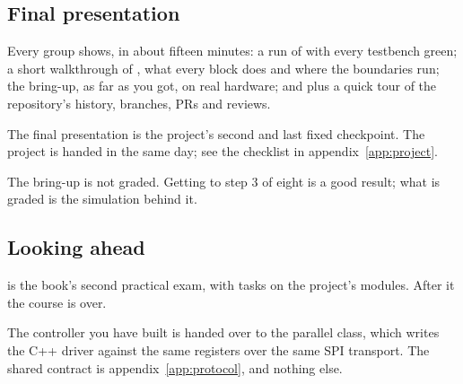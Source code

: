 \subsection*{Final presentation}
Every group shows, in about fifteen minutes: a run of  with every testbench
green; a short walkthrough of , what every block does and where the boundaries
run; the bring-up, as far as you got, on real hardware; and  plus a quick tour
of the repository's history, branches, PRs and reviews.

The final presentation is the project's second and last fixed checkpoint. The project is handed in
the same day; see the checklist in appendix~\ref{app:project}.

The bring-up is not graded. Getting to step 3 of eight is a good result; what is graded is the
simulation behind it.

\subsection*{Looking ahead}
 is the book's second practical exam, with tasks on the project's modules. After it
the course is over.

The controller you have built is handed over to the parallel class, which writes the C++ driver
against the same registers over the same SPI transport. The shared contract is
appendix~\ref{app:protocol}, and nothing else.
